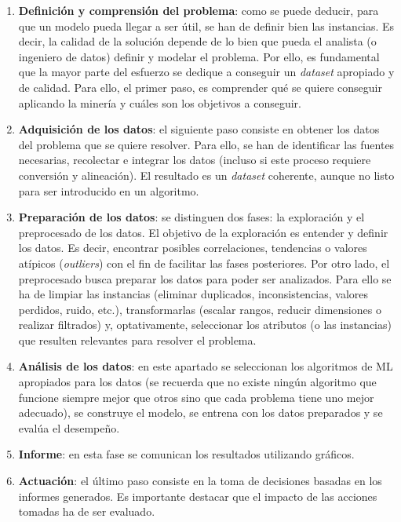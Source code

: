 \begin{enumerate}
	\item \textbf{Definición y comprensión del problema}: como se puede deducir, para que un modelo pueda llegar a ser útil, se han de definir bien las instancias. Es decir, la calidad de la solución depende de lo bien que pueda el analista (o ingeniero de datos) definir y modelar el problema. Por ello, es fundamental que la mayor parte del esfuerzo se dedique a conseguir un \textit{dataset} apropiado y de calidad. Para ello, el primer paso, es comprender qué se quiere conseguir aplicando la minería y cuáles son los objetivos a conseguir.
	
	\item \textbf{Adquisición de los datos}: el siguiente paso consiste en obtener los datos del problema que se quiere resolver. Para ello, se han de identificar las fuentes necesarias, recolectar e integrar los datos (incluso si este proceso requiere conversión y alineación). El resultado es un \textit{dataset} coherente, aunque no listo para ser introducido en un algoritmo.
	
	\item \textbf{Preparación de los datos}: se distinguen dos fases: la exploración y el preprocesado de los datos. El objetivo de la exploración es entender y definir los datos. Es decir, encontrar posibles correlaciones, tendencias o valores atípicos (\textit{outliers}) con el fin de facilitar las fases posteriores. Por otro lado, el preprocesado busca preparar los datos para poder ser analizados. Para ello se ha de limpiar las instancias (eliminar duplicados, inconsistencias, valores perdidos, ruido, etc.), transformarlas (escalar rangos, reducir dimensiones o realizar filtrados) y, optativamente, seleccionar los atributos (o las instancias) que resulten relevantes para resolver el problema.
	
	\item \textbf{Análisis de los datos}: en este apartado se seleccionan los algoritmos de ML apropiados para los datos (se recuerda que no existe ningún algoritmo que funcione siempre mejor que otros sino que cada problema tiene uno mejor adecuado), se construye el modelo, se entrena con los datos preparados y se evalúa el desempeño.
	\item \textbf{Informe}: en esta fase se comunican los resultados utilizando gráficos.
	\item \textbf{Actuación}: el último paso consiste en la toma de decisiones basadas en los informes generados. Es importante destacar que el impacto de las acciones tomadas ha de ser evaluado.
\end{enumerate}

